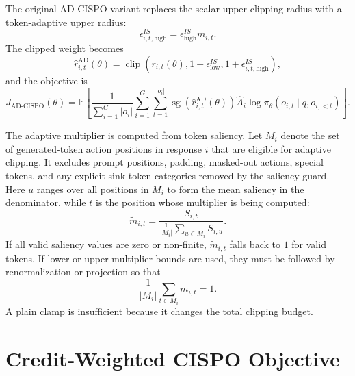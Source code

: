 \documentclass[11pt]{article}
\begin{document}
The original AD-CISPO variant replaces the scalar upper clipping radius with a
token-adaptive upper radius:
\begin{equation}
  \epsilon^{IS}_{i,t,\mathrm{high}}
  =
  \epsilon^{IS}_{\mathrm{high}} m_{i,t}.
\end{equation}
The clipped weight becomes
\begin{equation}
  \hat{r}^{\mathrm{AD}}_{i,t}(\theta)
  =
  \operatorname{clip}
  \left(
    r_{i,t}(\theta),
    1-\epsilon^{IS}_{\mathrm{low}},
    1+\epsilon^{IS}_{i,t,\mathrm{high}}
  \right),
\end{equation}
and the objective is
\begin{equation}
  J_{\mathrm{AD\mbox{-}CISPO}}(\theta)
  =
  \mathbb{E}
  \left[
    \frac{1}{\sum_{i=1}^G |o_i|}
    \sum_{i=1}^G \sum_{t=1}^{|o_i|}
    \operatorname{sg}\!\left(\hat{r}^{\mathrm{AD}}_{i,t}(\theta)\right)
    \hat{A}_i
    \log \pi_\theta(o_{i,t}\mid q,o_{i,<t})
  \right].
\end{equation}

The adaptive multiplier is computed from token saliency. Let $M_i$ denote the
set of generated-token action positions in response $i$ that are eligible for
adaptive clipping. It excludes prompt positions, padding, masked-out actions,
special tokens, and any explicit sink-token categories removed by the saliency
guard. Here $u$ ranges over all positions in $M_i$ to form the mean saliency in
the denominator, while $t$ is the position whose multiplier is being computed:
\begin{equation}
  \tilde{m}_{i,t}
  =
  \frac{S_{i,t}}
  {\frac{1}{|M_i|}\sum_{u \in M_i} S_{i,u}}.
\end{equation}
If all valid saliency values are zero or non-finite, $\tilde{m}_{i,t}$ falls
back to $1$ for valid tokens. If lower or upper multiplier bounds are used,
they must be followed by renormalization or projection so that
\begin{equation}
  \frac{1}{|M_i|}\sum_{t \in M_i} m_{i,t} = 1.
\end{equation}
A plain clamp is insufficient because it changes the total clipping budget.

\section{Credit-Weighted CISPO Objective}
\end{document}
